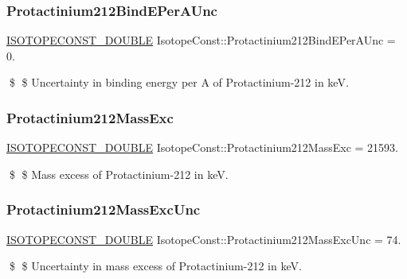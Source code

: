 \subsubsection{\texorpdfstring{Protactinium212\+Bind\+E\+Per\+A\+Unc}{Protactinium212BindEPerAUnc}}
{\footnotesize\ttfamily \mbox{\hyperlink{group___isotope_const-_macros_ga8f45a7272ce02c0b4c65c44636ed719a}{I\+S\+O\+T\+O\+P\+E\+C\+O\+N\+S\+T\+\_\+\+D\+O\+U\+B\+LE}} Isotope\+Const\+::\+Protactinium212\+Bind\+E\+Per\+A\+Unc = 0.}

\$ \$ Uncertainty in binding energy per A of Protactinium-\/212 in keV. \mbox{\label{group___isotope_const-_protactinium-_pa212_gacb61aee2c5278a8a2a04923978b650a2}} 
\subsubsection{\texorpdfstring{Protactinium212\+Mass\+Exc}{Protactinium212MassExc}}
{\footnotesize\ttfamily \mbox{\hyperlink{group___isotope_const-_macros_ga8f45a7272ce02c0b4c65c44636ed719a}{I\+S\+O\+T\+O\+P\+E\+C\+O\+N\+S\+T\+\_\+\+D\+O\+U\+B\+LE}} Isotope\+Const\+::\+Protactinium212\+Mass\+Exc = 21593.}

\$ \$ Mass excess of Protactinium-\/212 in keV. \mbox{\label{group___isotope_const-_protactinium-_pa212_ga161943566bc26126dda4522c8cb23878}} 
\subsubsection{\texorpdfstring{Protactinium212\+Mass\+Exc\+Unc}{Protactinium212MassExcUnc}}
{\footnotesize\ttfamily \mbox{\hyperlink{group___isotope_const-_macros_ga8f45a7272ce02c0b4c65c44636ed719a}{I\+S\+O\+T\+O\+P\+E\+C\+O\+N\+S\+T\+\_\+\+D\+O\+U\+B\+LE}} Isotope\+Const\+::\+Protactinium212\+Mass\+Exc\+Unc = 74.}

\$ \$ Uncertainty in mass excess of Protactinium-\/212 in keV. \mbox{\label{group___isotope_const-_protactinium-_pa212_ga4a3f992ef16926a17d884f79e3f30dc9}} 
